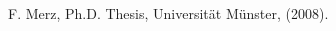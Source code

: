 \documentclass[11pt]{article}
\begin{document}
\begin{titlepage}
{%



























\end{titlepage}

\setcounter{page}{2}

\begin{thebibliography}{99}

 F. Merz, Ph.D. Thesis, Universit\"at M\"unster, (2008).


\end{thebibliography}



\end{document}

